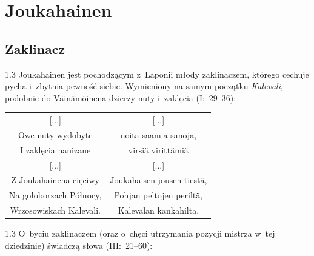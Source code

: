 \documentclass[11pt,a4paper,twoside]{report}
\begin{document}
\section{Joukahainen}
\vspace*{0.5\baselineskip}
\subsection*{Zaklinacz}
\begin{spacing}{1.3}
Joukahainen jest pochodzącym z~Laponii młody zaklinaczem, którego cechuje pycha i~zbytnia pewność siebie. Wymieniony na samym początku \emph{Kalevali}, podobnie do Väinämöinena dzierży nuty i~zaklęcia (I:~29--36):
\end{spacing}
{\centering
\small
\begin{longtable}{c c}
{[...]} & {[...]}\\
Owe nuty wydobyte & noita saamia sanoja, \\
I zaklęcia nanizane & virsiä virittämiä \\
{[...]} & {[...]}\\
Z Joukahainena cięciwy & Joukahaisen jousen tiestä, \\
Na gołoborzach Północy, & Pohjan peltojen periltä, \\
Wrzosowiskach Kalevali. & Kalevalan kankahilta. \\
\end{longtable}
}
\begin{spacing}{1.3}
O~byciu zaklinaczem (oraz o~chęci utrzymania pozycji mistrza w~tej dziedzinie) świadczą słowa (III:~21--60):
\end{spacing}
\end{document}
